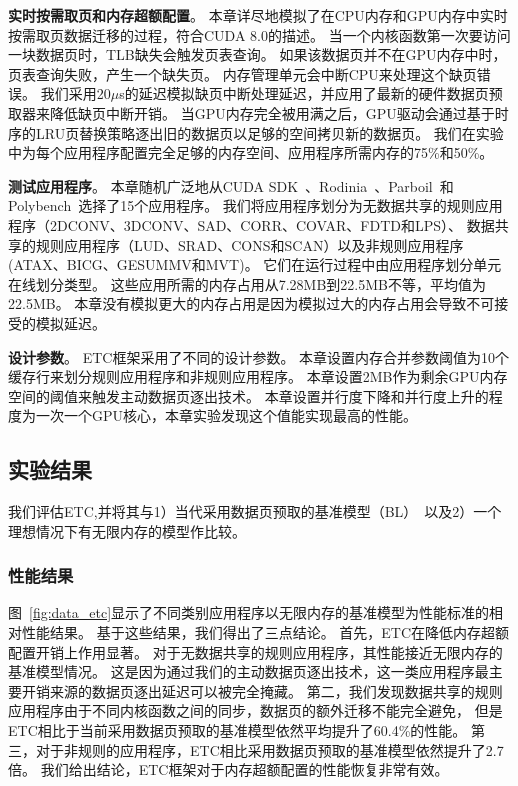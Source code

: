 \textbf{实时按需取页和内存超额配置}。
本章详尽地模拟了在CPU内存和GPU内存中实时按需取页数据迁移的过程，符合CUDA 8.0的描述。
当一个内核函数第一次要访问一块数据页时，TLB缺失会触发页表查询。
如果该数据页并不在GPU内存中时，页表查询失败，产生一个缺失页。
内存管理单元会中断CPU来处理这个缺页错误。
我们采用20$\mu$s的延迟模拟缺页中断处理延迟，并应用了最新的硬件数据页预取器来降低缺页中断开销。
当GPU内存完全被用满之后，GPU驱动会通过基于时序的LRU页替换策略逐出旧的数据页以足够的空间拷贝新的数据页。
我们在实验中为每个应用程序配置完全足够的内存空间、应用程序所需内存的75\%和50\%。

\textbf{测试应用程序}。
本章随机广泛地从CUDA SDK~、Rodinia~、Parboil~和Polybench~选择了15个应用程序。
我们将应用程序划分为无数据共享的规则应用程序（2DCONV、3DCONV、SAD、CORR、COVAR、FDTD和LPS）、
数据共享的规则应用程序（LUD、SRAD、CONS和SCAN）以及非规则应用程序(ATAX、BICG、GESUMMV和MVT)。
它们在运行过程中由应用程序划分单元在线划分类型。
这些应用所需的内存占用从7.28MB到22.5MB不等，平均值为22.5MB。
本章没有模拟更大的内存占用是因为模拟过大的内存占用会导致不可接受的模拟延迟。

\textbf{设计参数}。
ETC框架采用了不同的设计参数。
本章设置内存合并参数阈值为10个缓存行来划分规则应用程序和非规则应用程序。
本章设置2MB作为剩余GPU内存空间的阈值来触发主动数据页逐出技术。
本章设置并行度下降和并行度上升的程度为一次一个GPU核心，本章实验发现这个值能实现最高的性能。


\subsection{实验结果}
我们评估ETC,并将其与1）当代采用数据页预取的基准模型（BL）~以及2）一个理想情况下有无限内存的模型作比较。

\subsubsection{性能结果}

图~\ref{fig:data_etc}显示了不同类别应用程序以无限内存的基准模型为性能标准的相对性能结果。
基于这些结果，我们得出了三点结论。
首先，ETC在降低内存超额配置开销上作用显著。
对于无数据共享的规则应用程序，其性能接近无限内存的基准模型情况。
这是因为通过我们的主动数据页逐出技术，这一类应用程序最主要开销来源的数据页逐出延迟可以被完全掩藏。
第二，我们发现数据共享的规则应用程序由于不同内核函数之间的同步，数据页的额外迁移不能完全避免，
但是ETC相比于当前采用数据页预取的基准模型依然平均提升了60.4\%的性能。
第三，对于非规则的应用程序，ETC相比采用数据页预取的基准模型依然提升了2.7倍。
我们给出结论，ETC框架对于内存超额配置的性能恢复非常有效。

